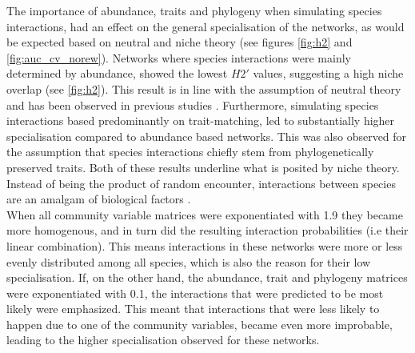\documentclass[12pt,a4paper]{article}
\begin{document}
The importance of abundance, traits and phylogeny when simulating species interactions, had an effect on the general specialisation of the networks, as would be expected based on neutral and niche theory (see figures \ref{fig:h2} and \ref{fig:auc_cv_norew}). Networks where species interactions were mainly determined by abundance, showed the lowest $H2'$ values, suggesting a high niche overlap (see \ref{fig:h2}). This result is in line with the assumption of neutral theory and has been observed in previous studies \parencite{Vazquez2005, Vazquez2007}. Furthermore, simulating species interactions based predominantly on trait-matching, led to substantially higher specialisation compared to abundance based networks. This was also observed for the assumption that species interactions chiefly stem from phylogenetically preserved traits. Both of these results underline what is posited by niche theory. Instead of being the product of random encounter, interactions between species are an amalgam of biological factors \parencite{Jordano2003, Rezende2007, Vazquez2009, Olesen2011}.\\
 When all community variable matrices were exponentiated with 1.9 they became more homogenous, and in turn did the resulting interaction probabilities (i.e their linear combination). This means interactions in these networks were more or less evenly distributed among all species, which is also the reason for their low specialisation. If, on the other hand, the abundance, trait and phylogeny matrices were exponentiated with 0.1, the interactions that were predicted to be most likely were emphasized. This meant that interactions that were less likely to happen due to one of the community variables, became even more improbable, leading to the higher specialisation observed for these networks. \paragraph{}
\end{document}
